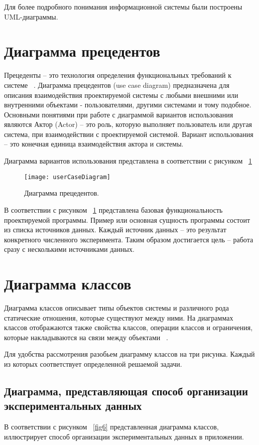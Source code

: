 \documentclass[14pt]{extreport}
\begin{document}
Для более подробного понимания информационной системы были построены UML-диаграммы. 

\section{Диаграмма прецедентов}
Прецеденты -- это технология определения функциональных требований к системе ~\cite{umlDistilled}. 
Диаграмма прецедентов (use case diagram) предназначена для описания взаимодействия проектируемой системы с любыми внешними или внутренними объектами - пользователями, другими системами и тому подобное.
Основными понятиями при работе с диаграммой вариантов использования являются 
Актор (Actor) -- это роль, которую выполняет пользователь или другая система, при взаимодействии с проектируемой системой.
Вариант использования -- это конечная единица взаимодействия актора и системы. 

Диаграмма вариантов использования представлена в соответствии с рисунком ~\ref{fig5}
\begin{figure}[H]
\centerline{\texttt{[image: userCaseDiagram]}}
\caption{Диаграмма прецедентов.}
\label{fig5}
\end{figure}

В соответствии с рисунком ~\ref{fig5} представлена базовая функциональность проектируемой программы. Пример или основная сущность программы состоит из списка источников данных. Каждый источник данных -- это результат конкретного численного эксперимента. Таким образом достигается цель -- работа сразу с несколькими источниками данных.   
\section{Диаграмма классов}
Диаграмма классов описывает типы объектов системы и различного рода статические отношения, которые существуют между ними. На диаграммах классов отображаются также свойства классов, операции классов и ограничения, которые накладываются на связи между объектами ~\cite{umlDistilled}.

Для удобства рассмотрения разобьем диаграмму классов на три рисунка. Каждый из которых соответствует определенной решаемой задачи. 

\subsection{Диаграмма, представляющая способ организации экспериментальных данных}

В соответствии с рисунком ~\ref{fig6} представленная диаграмма классов, иллюстрирует способ организации экспериментальных данных в приложении. 
\end{document}
